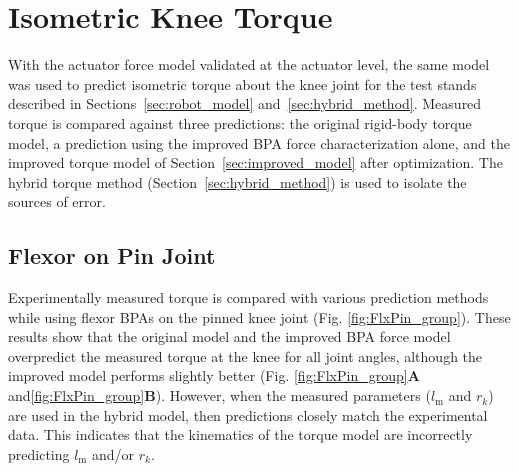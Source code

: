 
\section{Isometric Knee Torque}\label{sec:results_torque}

With the actuator force model validated at the actuator level, the same model was used to predict isometric torque about the knee joint for the test stands described in Sections~\ref{sec:robot_model} and~\ref{sec:hybrid_method}. Measured torque is compared against three predictions: the original rigid-body torque model, a prediction using the improved BPA force characterization alone, and the improved torque model of Section~\ref{sec:improved_model} after optimization. The hybrid torque method (Section~\ref{sec:hybrid_method}) is used to isolate the sources of error.

\subsection{Flexor on Pin Joint}

Experimentally measured torque is compared with various prediction methods while using flexor BPAs on the pinned knee joint (Fig. \ref{fig:FlxPin_group}). These results show that the original model and the improved BPA force model overpredict the measured torque at the knee for all joint angles, although the improved model performs slightly better (Fig. \ref{fig:FlxPin_group}\textbf{A} and\ref{fig:FlxPin_group}\textbf{B}). However, when the measured parameters ($l_\text{m}$ and $r_{k}$) are used in the hybrid model, then predictions closely match the experimental data. This indicates that the kinematics of the torque model are incorrectly predicting $l_\text{m}$ and/or $r_{k}$. 


